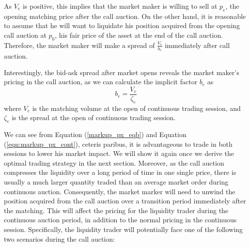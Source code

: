 As $V_e$ is positive, this implies that the market maker is willing to sell at $p_e$, the opening matching price after the call auction. On the other hand, it is reasonable to assume that he will want to liquidate his position acquired from the opening call auction at $p_0$, his fair price of the asset at the end of the call auction. Therefore, the market maker will make a spread of $\frac{V_e}{b_e}$ immediately after call auction.

Interestingly, the bid-ask spread after market opens reveals the market maker's pricing in the call
auction, as we can calculate the implicit factor $b_e$ as
\begin{equation}\label{eqn:expected_spread}
  b_e = \frac{V_e}{\zeta_e}
\end{equation}
where $V_e$ is the matching volume at the open of continuous trading session, and $\zeta_e$ is the spread at the open of continuous trading session.

We can see from Equation (\ref{markup_px_eqb}) and Equation (\ref{eqn:markup_px_cont}), ceteris paribus, it is advantageous to trade in both sessions to lower his market impact. We will show it again once we derive the optimal trading strategy in the next section. Moreover, as the call auction compresses the liquidity over a long period of time in one single price, there is usually a much larger quantity traded than an average market order during continuous auction. Consequently, the market marker will need to unwind the position acquired from the call auction over a transition period immediately after the matching. This will affect the pricing for the liquidity trader during the continuous auction period, in addition to the normal pricing in the continuous session. Specifically, the liquidity trader will potentially face one of the following two scenarios during the call auction:

